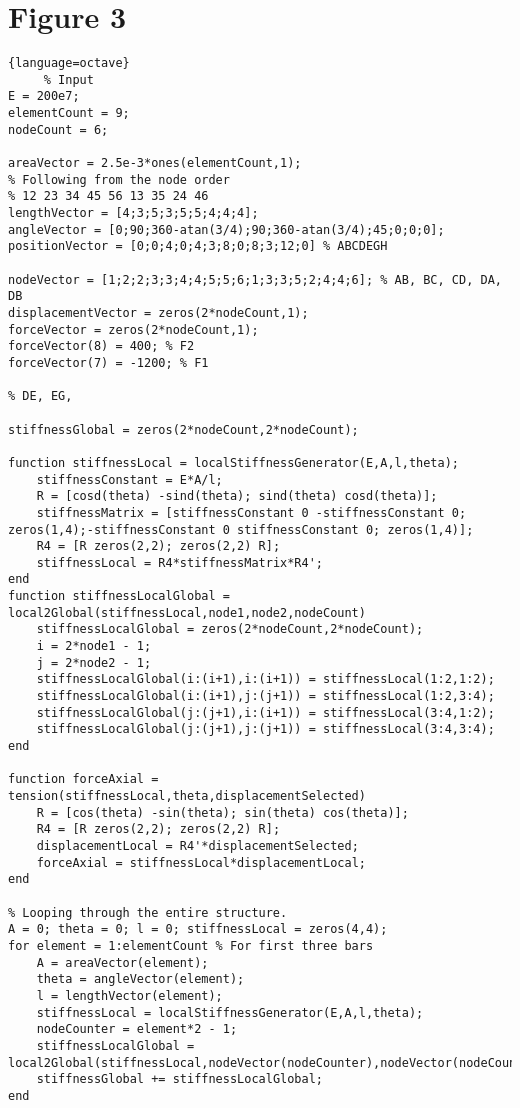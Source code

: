 \documentclass{article}
\begin{document}
\section{Figure 3} %
\begin{lstlisting}{language=octave}
     % Input
E = 200e7;
elementCount = 9;
nodeCount = 6;

areaVector = 2.5e-3*ones(elementCount,1);
% Following from the node order
% 12 23 34 45 56 13 35 24 46
lengthVector = [4;3;5;3;5;5;4;4;4];
angleVector = [0;90;360-atan(3/4);90;360-atan(3/4);45;0;0;0];
positionVector = [0;0;4;0;4;3;8;0;8;3;12;0] % ABCDEGH

nodeVector = [1;2;2;3;3;4;4;5;5;6;1;3;3;5;2;4;4;6]; % AB, BC, CD, DA, DB
displacementVector = zeros(2*nodeCount,1);
forceVector = zeros(2*nodeCount,1);
forceVector(8) = 400; % F2
forceVector(7) = -1200; % F1

% DE, EG,

stiffnessGlobal = zeros(2*nodeCount,2*nodeCount);

function stiffnessLocal = localStiffnessGenerator(E,A,l,theta);
    stiffnessConstant = E*A/l;
    R = [cosd(theta) -sind(theta); sind(theta) cosd(theta)];
    stiffnessMatrix = [stiffnessConstant 0 -stiffnessConstant 0; zeros(1,4);-stiffnessConstant 0 stiffnessConstant 0; zeros(1,4)];
    R4 = [R zeros(2,2); zeros(2,2) R];
    stiffnessLocal = R4*stiffnessMatrix*R4';
end
function stiffnessLocalGlobal = local2Global(stiffnessLocal,node1,node2,nodeCount)
    stiffnessLocalGlobal = zeros(2*nodeCount,2*nodeCount);
    i = 2*node1 - 1;
    j = 2*node2 - 1;
    stiffnessLocalGlobal(i:(i+1),i:(i+1)) = stiffnessLocal(1:2,1:2);
    stiffnessLocalGlobal(i:(i+1),j:(j+1)) = stiffnessLocal(1:2,3:4);
    stiffnessLocalGlobal(j:(j+1),i:(i+1)) = stiffnessLocal(3:4,1:2);
    stiffnessLocalGlobal(j:(j+1),j:(j+1)) = stiffnessLocal(3:4,3:4);
end

function forceAxial = tension(stiffnessLocal,theta,displacementSelected)
    R = [cos(theta) -sin(theta); sin(theta) cos(theta)];
    R4 = [R zeros(2,2); zeros(2,2) R];
    displacementLocal = R4'*displacementSelected;
    forceAxial = stiffnessLocal*displacementLocal;
end

% Looping through the entire structure.
A = 0; theta = 0; l = 0; stiffnessLocal = zeros(4,4);
for element = 1:elementCount % For first three bars
    A = areaVector(element);
    theta = angleVector(element);
    l = lengthVector(element);
    stiffnessLocal = localStiffnessGenerator(E,A,l,theta);
    nodeCounter = element*2 - 1;
    stiffnessLocalGlobal = local2Global(stiffnessLocal,nodeVector(nodeCounter),nodeVector(nodeCounter+1),nodeCount);
    stiffnessGlobal += stiffnessLocalGlobal;
end


\end{lstlisting}
\end{document}
